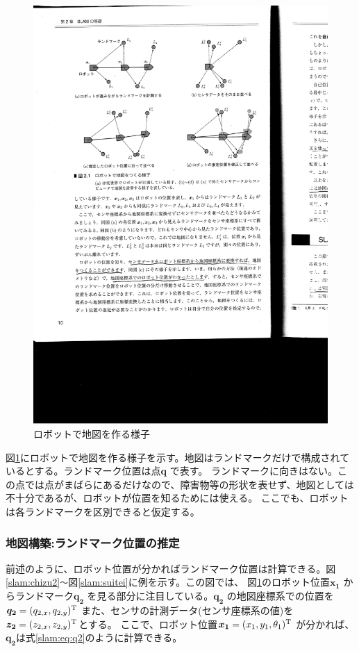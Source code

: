 \begin{figure}[h]
  \begin{center}
  \includegraphics[width=\linewidth]{img/slam_5.pdf}
  \caption{ロボットで地図を作る様子}
  \label{slam:chizu1}
  \end{center}
\end{figure}

図\ref{slam:chizu1}にロボットで地図を作る様子を示す。地図はランドマークだけで構成されているとする。ランドマーク位置は点$\bm{q}$ で表す。
ランドマークに向きはない。この点では点がまばらにあるだけなので、障害物等の形状を表せず、地図としては不十分であるが、ロボットが位置を知るためには使える。
ここでも、ロボットは各ランドマークを区別できると仮定する。

\subsubsection{地図構築:ランドマーク位置の推定}
前述のように、ロボット位置が分かればランドマーク位置は計算できる。図\ref{slam:chizu2}\verb|～|図\ref{slam:suitei}に例を示す。この図では、
図\ref{slam:chizu1}のロボット位置$\bm{x_1}$ からランドマーク$\bm{q_2}$ を見る部分に注目している。$\bm{q_2}$ の地図座標系での位置を
$\bm{q_2}=(q_{2,x},q_{2,y})^{\rm{T}}$ また、センサの計測データ(センサ座標系の値)を$\bm{z_2} = (z_{2,x},z_{2,y})^{\rm{T}}$とする。
ここで、ロボット位置$\bm{x_1} = (x_1, y_1,\theta_1)^{\rm{T}}$ が分かれば、$\bm{q_2}$は式\eqref{slam:eq:q2}のように計算できる。

